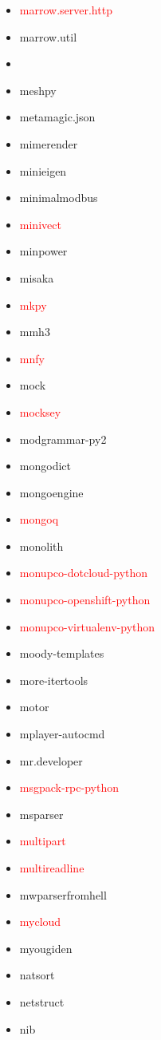 \documentclass{l4proj}
\begin{document}
\begin{appendices}
{\begin{itemize}
\item\textcolor{red}{marrow.server.http}
\item marrow.util
\item {}
\item meshpy
\item metamagic.json
\item mimerender
\item minieigen
\item minimalmodbus
\item\textcolor{red}{minivect}
\item minpower
\item misaka
\item\textcolor{red}{mkpy}
\item mmh3
\item\textcolor{red}{mnfy}
\item mock
\item\textcolor{red}{mocksey}
\item modgrammar-py2
\item mongodict
\item mongoengine
\item\textcolor{red}{mongoq}
\item monolith
\item\textcolor{red}{monupco-dotcloud-python}
\item\textcolor{red}{monupco-openshift-python}
\end{itemize}
}%
\noindent\parbox[t]{0.32\textwidth}{\raggedright%
\begin{itemize}
\item\textcolor{red}{monupco-virtualenv-python}
\item moody-templates
\item more-itertools
\item motor
\item mplayer-autocmd
\item mr.developer
\item\textcolor{red}{msgpack-rpc-python}
\item msparser
\item\textcolor{red}{multipart}
\item\textcolor{red}{multireadline}
\item mwparserfromhell
\item\textcolor{red}{mycloud}
\item myougiden
\item natsort
\item netstruct
\item nib

\end{itemize}}
\end{appendices}
\end{document}
